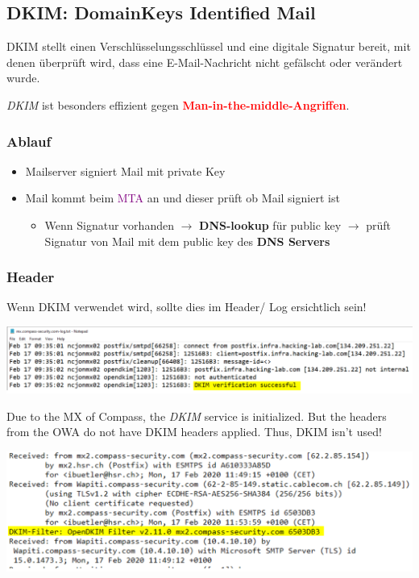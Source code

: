 \subsection{DKIM: DomainKeys Identified Mail}
DKIM stellt einen Verschlüsselungsschlüssel und eine digitale Signatur bereit, mit denen überprüft wird, dass eine E-Mail-Nachricht nicht gefälscht oder verändert wurde.

\textit{DKIM} ist besonders effizient gegen \textcolor{red}{\textbf{Man-in-the-middle-Angriffen}}.

\subsubsection{Ablauf}
\begin{itemize}
    \item Mailserver signiert Mail mit private Key
    \item Mail kommt beim  \textcolor{purple}{MTA} an und dieser prüft ob Mail signiert ist
    \begin{itemize}
        \item Wenn Signatur vorhanden $\rightarrow$ \textbf{DNS-lookup} für public key $\rightarrow$ prüft Signatur von Mail mit dem public key des \textbf{DNS Servers}\\
    \end{itemize}
\end{itemize}

\subsubsection{Header}
Wenn DKIM verwendet wird, sollte dies im Header/ Log ersichtlich sein!
\begin{center}
    \vspace{-8pt}
    \includegraphics[width=1.0\linewidth]{./img/07-mail_security/dkim}
    \vspace{-8pt}
\end{center}
Due to the MX of Compass, the \textit{DKIM} service is initialized. But the headers from the OWA do not have DKIM headers applied. Thus, DKIM isn't used!
\begin{center}
    \vspace{-8pt}
    \includegraphics[width=.8\linewidth]{./img/07-mail_security/dkim2}
    \vspace{-8pt}
\end{center}

